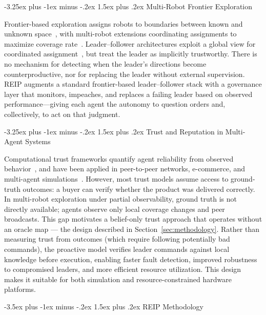 \documentclass[conference]{IEEEtran}
\makeatletter
\renewcommand{\section}{\@startsection{section}{1}{\z@}%
  {-3.5ex plus -1ex minus -.2ex}%
  {1.5ex plus .2ex}%
  {\normalfont\large\bfseries\centering}}
\renewcommand{\subsection}{\@startsection{subsection}{2}{\z@}%
  {-3.25ex plus -1ex minus -.2ex}%
  {1.5ex plus .2ex}%
  {\normalfont\normalsize\itshape\centering}}
\makeatother
\begin{document}
\subsection{Multi-Robot Frontier Exploration}

Frontier-based exploration assigns robots to boundaries between known and unknown space~\cite{yamauchi1997frontier}, with multi-robot extensions coordinating assignments to maximize coverage rate~\cite{burgard2000collaborative}. Leader--follower architectures exploit a global view for coordinated assignment~\cite{simmons2000coordination}, but treat the leader as implicitly trustworthy. There is no mechanism for detecting when the leader's directions become counterproductive, nor for replacing the leader without external supervision. REIP augments a standard frontier-based leader--follower stack with a governance layer that monitors, impeaches, and replaces a failing leader based on observed performance---giving each agent the autonomy to question orders and, collectively, to act on that judgment.

\subsection{Trust and Reputation in Multi-Agent Systems}

Computational trust frameworks quantify agent reliability from observed behavior~\cite{marsh1994formalising}, and have been applied in peer-to-peer networks, e-commerce, and multi-agent simulations~\cite{ramchurn2004trust}. However, most trust models assume access to ground-truth outcomes: a buyer can verify whether the product was delivered correctly. In multi-robot exploration under partial observability, ground truth is not directly available; agents observe only local coverage changes and peer broadcasts. This gap motivates a belief-only trust approach that operates without an oracle map --- the design described in Section~\ref{sec:methodology}. Rather than measuring trust from outcomes (which require following potentially bad commands), the proactive model verifies leader commands against local knowledge before execution, enabling faster fault detection, improved robustness to compromised leaders, and more efficient resource utilization. This design makes it suitable for both simulation and resource-constrained hardware platforms.


\section{REIP Methodology}
\label{sec:methodology}
\end{document}
